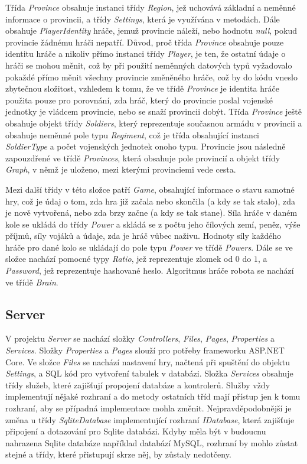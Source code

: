 \documentclass[a4paper,12pt]{article}
\begin{document}
Třída \textit{Province} obsahuje instanci třídy \textit{Region}, jež uchovává základní a neměnné informace o provincii, a třídy \textit{Settings}, která je využívána v metodách. Dále obsahuje \textit{PlayerIdentity} hráče, jemuž provincie náleží, nebo hodnotu \textit{null}, pokud provincie žádnému hráči nepatří. Důvod, proč třída \textit{Province} obsahuje pouze identitu hráče a nikoliv přímo instanci třídy \textit{Player}, je ten, že ostatní údaje o hráči se mohou měnit, což by při použití neměnných datových typů vyžadovalo pokaždé přímo měnit všechny provincie změněného hráče, což by do kódu vneslo zbytečnou složitost, vzhledem k tomu, že ve třídě \textit{Province} je identita hráče použita pouze pro porovnání, zda hráč, který do provincie poslal vojenské jednotky je vládcem provincie, nebo se snaží provincii dobýt. Třída \textit{Province} ještě obsahuje objekt třídy \textit{Soldiers}, který reprezentuje současnou armádu v provincii a obsahuje neměnné pole typu \textit{Regiment}, což je třída obsahující instanci \textit{SoldierType} a počet vojenských jednotek onoho typu. Provincie jsou následně zapouzdřené ve třídě \textit{Provinces}, která obsahuje pole provincií a objekt třídy \textit{Graph}, v němž je uloženo, mezi kterými provinciemi vede cesta.

Mezi další třídy v této složce patří \textit{Game}, obsahující informace o stavu samotné hry, což je údaj o tom, zda hra již začala nebo skončila (a kdy se tak stalo), zda je nově vytvořená, nebo zda brzy začne (a kdy se tak stane). Síla hráče v daném kole se ukládá do třídy \textit{Power} a skládá se z počtu jeho čílových zemí, peněz, výše příjmů, síly vojáků a údaje, zda je hráč vůbec naživu. Hodnoty síly každého hráče pro dané kolo se ukládají do pole typu \textit{Power} ve třídě \textit{Powers}. Dále se ve složce nachází pomocné typy \textit{Ratio}, jež reprezentuje zlomek od $0$ do $1$, a \textit{Password}, jež reprezentuje hashované heslo. Algoritmus hráče robota se nachází ve třídě \textit{Brain}.

\subsection{Server}
V projektu \textit{Server} se nachází složky \textit{Controllers}, \textit{Files}, \textit{Pages}, \textit{Properties} a \textit{Services}. Složky \textit{Properties} a \textit{Pages} slouží pro potřeby frameworku ASP.NET Core. Ve složce \textit{Files} se nachází nastavení hry, načtená při spuštění do objektu \textit{Settings}, a SQL kód pro vytvoření tabulek v databázi. Složka \textit{Services} obsahuje třídy služeb, které zajišťují propojení databáze a kontrolerů. Služby vždy implementují nějaké rozhraní a do metody ostatních tříd mají přístup jen k tomu rozhraní, aby se případná implementace mohla změnit. Nejpravděpodobnější je změna u třídy \textit{SqliteDatabase} implementující rozhraní \textit{IDatabase}, která zajišťuje připojení a dotazování pro Sqlite databázi. Kdyby měla být v budoucnu nahrazena Sqlite databáze například databází MySQL, rozhraní by mohlo zůstat stejné a třídy, které přistupují skrze něj, by zůstaly nedotčeny.

\newpage
\printbibliography[heading=bibintoc, title={Použitá literatura}]
\end{document}
